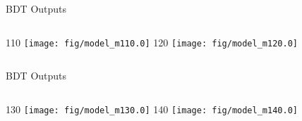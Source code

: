 \documentclass[t, 8pt]{beamer}
\begin{document}
\begin{frame}{BDT Outputs}
  \vspace{1cm}
  \begin{columns}[c]
    110
    \texttt{[image: fig/model\_m110.0]}
    120
    \texttt{[image: fig/model\_m120.0]}
  \end{columns}
\end{frame}

\begin{frame}{BDT Outputs}
  \vspace{1cm}
  \begin{columns}[c]
    130
    \texttt{[image: fig/model\_m130.0]}
    140
    \texttt{[image: fig/model\_m140.0]}
  \end{columns}
\end{frame}
\end{document}
